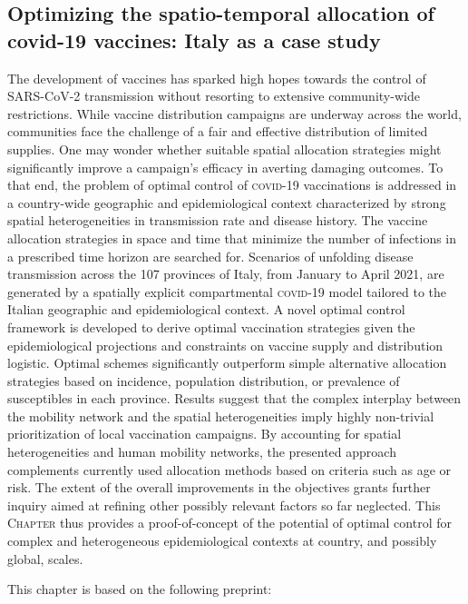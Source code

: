 \begin{fullwidth}
	\chapter[Optimizing the spatio-temporal allocation of  covid-19 vaccines: Italy as a case study]{Optimizing the spatio-temporal allocation of \\covid-19 vaccines: Italy as a case study}
\label{ch:covid-italy-ocp}

The development of vaccines has sparked high hopes towards the control of SARS-CoV-2 transmission without resorting to extensive community-wide restrictions. While vaccine distribution campaigns are underway across the world, communities face the challenge of a fair and effective distribution of limited supplies. One may wonder whether suitable spatial allocation strategies might significantly improve a campaign's efficacy in averting damaging outcomes. To that end, the problem of optimal control of \textsc{covid}-19 vaccinations is addressed in a country-wide geographic and epidemiological context characterized by strong spatial heterogeneities in transmission rate and disease history. The vaccine allocation strategies in space and time that minimize the number of infections in a prescribed time horizon are searched for. Scenarios of unfolding disease transmission across the 107 provinces of Italy, from January to April 2021, are generated by a spatially explicit compartmental \textsc{covid}-19 model tailored to the Italian geographic and epidemiological context\parencite{Bertuzzo:GeographyCOVID19Spread:2020,Gatto:SpreadDynamicsCOVID19:2020}. A novel optimal control framework is developed to derive optimal vaccination strategies given the epidemiological projections and constraints on vaccine supply and distribution logistic. Optimal schemes significantly outperform simple alternative allocation strategies based on incidence, population distribution, or prevalence of susceptibles in each province. Results suggest that the complex interplay between the mobility network and the spatial heterogeneities imply highly non-trivial prioritization of local vaccination campaigns. By accounting for spatial heterogeneities and human mobility networks, the presented approach complements currently used allocation methods based on criteria such as age or risk. The extent of the overall improvements in the objectives grants further inquiry aimed at refining other possibly relevant factors so far neglected. This \textsc{Chapter} thus provides a proof-of-concept of the potential of optimal control for complex and heterogeneous epidemiological contexts at country, and possibly global, scales. 

This chapter is based on the following preprint: 


\end{fullwidth}

